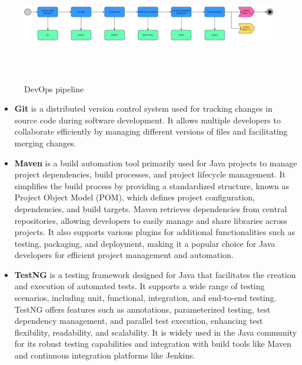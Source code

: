 \documentclass[12pt,a4paper,oneside]{report}
\begin{document}
\begin{figure}[ht]
    \centering
    \includegraphics[width=180mm , height = 50mm]{images/devops stack.png}
    \caption{DevOps pipeline}
    \label{fig:figure2_2}
\end{figure}

\begin{itemize}
  


\item \textbf{Git} is a distributed version control system used for tracking changes in source code during software development. It allows multiple developers to collaborate efficiently by managing different versions of files and facilitating merging changes.

\item \textbf{Maven} is a build automation tool primarily used for Java projects to manage project dependencies, build processes, and project lifecycle management. It simplifies the build process by providing a standardized structure, known as Project Object Model (POM), which defines project configuration, dependencies, and build targets. Maven retrieves dependencies from central repositories, allowing developers to easily manage and share libraries across projects. It also supports various plugins for additional functionalities such as testing, packaging, and deployment, making it a popular choice for Java developers for efficient project management and automation.

\item \textbf{TestNG} is a testing framework designed for Java that facilitates the creation and execution of automated tests. It supports a wide range of testing scenarios, including unit, functional, integration, and end-to-end testing. TestNG offers features such as annotations, parameterized testing, test dependency management, and parallel test execution, enhancing test flexibility, readability, and scalability. It is widely used in the Java community for its robust testing capabilities and integration with build tools like Maven and continuous integration platforms like Jenkins.


\end{itemize}
\end{document}
